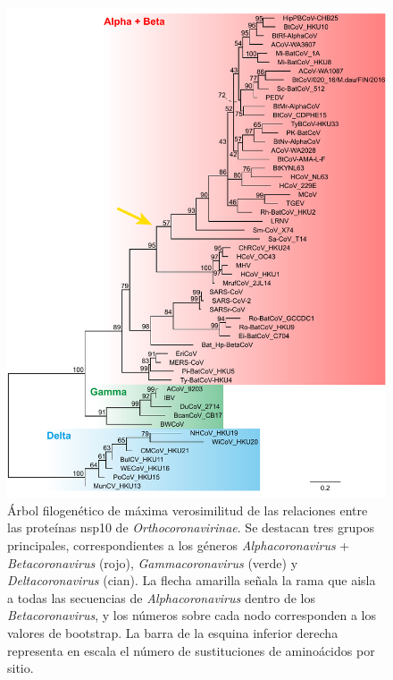 \begin{figure}[H]
    \centering
    \includegraphics[width=1\textwidth]{img/fig5.pdf}
    \caption{Árbol filogenético de máxima verosimilitud de las relaciones 
    entre las proteínas nsp10 de \textit{Orthocoronavirinae}. Se destacan 
    tres grupos principales, correspondientes a los géneros
    \textit{Alphacoronavirus} + \textit{Betacoronavirus} (rojo), 
    \textit{Gammacoronavirus} (verde) y \textit{Deltacoronavirus} (cian). 
    La flecha amarilla señala la rama que aisla a todas las secuencias de 
    \textit{Alphacoronavirus} dentro de los \textit{Betacoronavirus}, y los 
    números sobre cada nodo corresponden a los valores de bootstrap. La 
    barra de la esquina inferior derecha representa en escala el número de 
    sustituciones de aminoácidos por sitio.}\label{fig:nsp10tree}
\end{figure}

